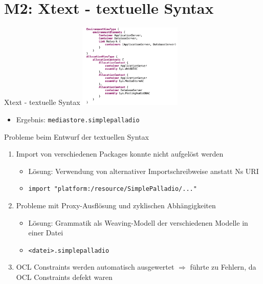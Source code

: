 \section[M2: Xtext]{M2: Xtext - textuelle Syntax}
\begin{frame}{Xtext - textuelle Syntax}
    \centering
    \includegraphics[height=40mm]{figures/xtext.png}
    \begin{itemize}
        \item Ergebnis: \texttt{mediastore.simplepalladio}
    \end{itemize}
\end{frame}

\begin{frame}{Probleme beim Entwurf der textuellen Syntax}
	\begin{enumerate}
		\item Import von verschiedenen Packages konnte nicht aufgelöst werden
		\begin{itemize}
            \item Lösung: Verwendung von alternativer Importschreibweise anstatt Ns URI
            \item \texttt{import "platform:/resource/SimplePalladio/..."}
        \end{itemize}
        \item Probleme mit Proxy-Ausflösung und zyklischen Abhängigkeiten
		\begin{itemize}
            \item Lösung: Grammatik als Weaving-Modell der verschiedenen Modelle in einer Datei
            \item \texttt{<datei>.simplepalladio}
        \end{itemize}
        \item OCL Constraints werden automatisch ausgewertet $\Rightarrow$ führte zu Fehlern, da OCL Constraints defekt waren
	\end{enumerate}
\end{frame}